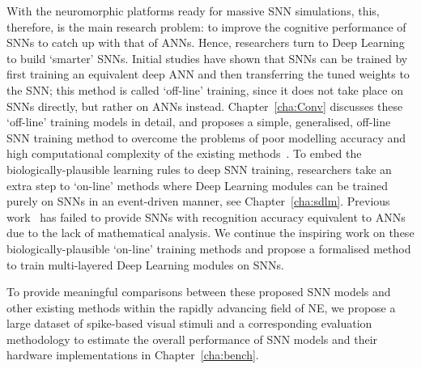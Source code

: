 

With the neuromorphic platforms ready for massive SNN simulations, this, therefore, is the main research problem: to improve the cognitive performance of SNNs to catch up with that of ANNs.
Hence, researchers turn to Deep Learning to build `smarter' SNNs.
Initial studies have shown that SNNs can be trained by first training an equivalent deep ANN and then transferring the tuned weights to the SNN;
this method is called `off-line' training, since it does not take place on SNNs directly, but rather on ANNs instead.
Chapter~\ref{cha:Conv} discusses these `off-line' training models in detail, and proposes a simple, generalised, off-line SNN training method to overcome the problems of poor modelling accuracy and high computational complexity of the existing methods~\citep{Jug_etal_2012,hunsberger2015spiking,diehl2015fast}.
To embed the biologically-plausible learning rules to deep SNN training, researchers take an extra step to `on-line' methods where Deep Learning modules can be trained purely on SNNs in an event-driven manner, see Chapter~\ref{cha:sdlm}.
Previous work~\citep{neil2013online,neftci2013event,burbank2015mirrored} has failed to provide SNNs with recognition accuracy equivalent to ANNs due to the lack of mathematical analysis.
We continue the inspiring work on these biologically-plausible `on-line' training methods and propose a formalised method to train multi-layered Deep Learning modules on SNNs.

To provide meaningful comparisons between these proposed SNN models and other existing methods within the rapidly advancing field of NE, we propose a large dataset of spike-based visual stimuli and a corresponding evaluation methodology to estimate the overall performance of SNN models and their hardware implementations in Chapter~\ref{cha:bench}.

